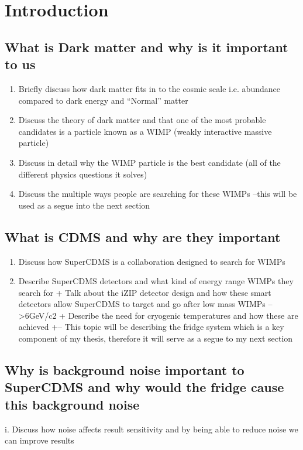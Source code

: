 \section{Introduction}
\subsection{What is Dark matter and why is it important to us}

\begin{enumerate}
    \item Briefly discuss how dark matter fits in to the cosmic scale i.e. abundance compared to dark energy and “Normal” matter
    \item Discuss the theory of dark matter and that one of the most probable candidates is a particle known as a WIMP (weakly interactive massive particle)
    \item Discuss in detail why the WIMP particle is the best candidate (all of the different physics questions it solves)
    \item Discuss the multiple ways people are searching for these WIMPs –this will be used as a segue into the next section
\end{enumerate}

\subsection{What is CDMS and why are they important}

\begin{enumerate}
    \item Discuss how SuperCDMS is a collaboration designed to search for WIMPs
    \item Describe SuperCDMS detectors and what kind of energy range WIMPs they search for 
        + Talk about the iZIP detector design and how these smart detectors allow SuperCDMS to target and go after low mass WIMPs –   >6GeV/c2
        + Describe the need for cryogenic temperatures and how these are achieved
        +--	This topic will be describing the fridge system which is a key component of my thesis, therefore it will serve as a segue to my next section 
\end{enumerate}

\subsection{	Why is background noise important to SuperCDMS and why would the fridge cause this background noise}
i.	Discuss how noise affects result sensitivity and by being able to reduce noise we can improve results 

